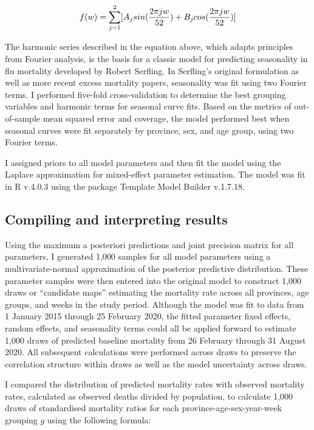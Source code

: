 \documentclass[
]{report}
\begin{document}
\[f(w) = \large\sum_{j=1}^{2}[A_{j}sin(\frac{2\pi j w}{52}) + B_{j}cos(\frac{2\pi j w}{52})]\]

The harmonic series described in the equation above, which adapts principles from Fourier analysis, is the basis for a classic model for predicting seasonality in flu mortality developed by Robert Serfling\autocite{Serfling1963}. In Serfling's original formulation as well as more recent excess mortality papers, seasonality was fit using two Fourier terms\autocite{Weinberger2020a,Woolf2020}. I performed five-fold cross-validation to determine the best grouping variables and harmonic terms for seasonal curve fits. Based on the metrics of out-of-sample mean squared error and coverage, the model performed best when seasonal curves were fit separately by province, sex, and age group, using two Fourier terms.

I assigned priors to all model parameters and then fit the model using the Laplace approximation for mixed-effect parameter estimation\autocite{Kristensen2016,Thorson2016}. The model was fit in R v.4.0.3 using the package Template Model Builder v.1.7.18\autocite{Kristensen2016,RCoreTeam2018}.

\hypertarget{compiling-and-interpreting-results}{%
\subsection{Compiling and interpreting results}\label{compiling-and-interpreting-results}}

Using the maximum a posteriori predictions and joint precision matrix for all parameters, I generated 1,000 samples for all model parameters using a multivariate-normal approximation of the posterior predictive distribution. These parameter samples were then entered into the original model to construct 1,000 draws or ``candidate maps'' estimating the mortality rate across all provinces, age groups, and weeks in the study period\autocite{Patil2011}. Although the model was fit to data from 1 January 2015 through 25 February 2020, the fitted parameter fixed effects, random effects, and seasonality terms could all be applied forward to estimate 1,000 draws of predicted baseline mortality from 26 February through 31 August 2020. All subsequent calculations were performed across draws to preserve the correlation structure within draws as well as the model uncertainty across draws.

I compared the distribution of predicted mortality rates with observed mortality rates, calculated as observed deaths divided by population, to calculate 1,000 draws of standardised mortality ratios for each province-age-sex-year-week grouping \(g\) using the following formula:
\end{document}
